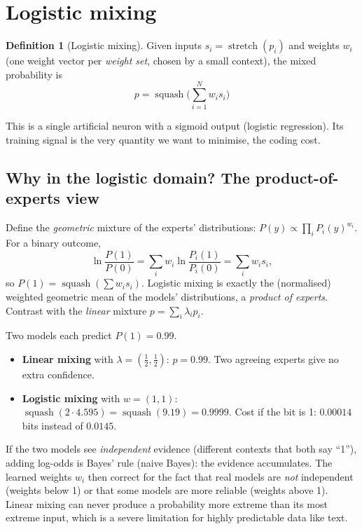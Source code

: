 \documentclass[11pt,a4paper,openany]{book}
\newcommand{\st}{\operatorname{stretch}}
\newcommand{\sq}{\operatorname{squash}}
\theoremstyle{definition}
\newtheorem{definition}{Definition}[chapter]
\theoremstyle{remark}
\begin{document}
\section{Logistic mixing}

\begin{definition}[Logistic mixing]
Given inputs $s_i=\st(p_i)$ and weights $w_i$ (one weight vector per \emph{weight set}, chosen by a small context), the mixed probability is
\[
\boxed{\;p=\sq\Big(\sum_{i=1}^Nw_is_i\Big)\;}
\]
\end{definition}
This is a single artificial neuron with a sigmoid output (logistic regression). Its training signal is the very quantity we want to minimise, the coding cost.

\subsection{Why in the logistic domain? The product-of-experts view}

Define the \emph{geometric} mixture of the experts' distributions: $P(y)\propto\prod_iP_i(y)^{w_i}$. For a binary outcome,
\[
\ln\frac{P(1)}{P(0)}=\sum_iw_i\ln\frac{P_i(1)}{P_i(0)}=\sum_iw_is_i,
\]
so $P(1)=\sq(\sum w_is_i)$. Logistic mixing is exactly the (normalised) weighted geometric mean of the models' distributions, a \emph{product of experts}. Contrast with the \emph{linear} mixture $p=\sum_i\lambda_ip_i$.

\begin{example}
Two models each predict $P(1)=0.99$.
\begin{itemize}
\item \textbf{Linear mixing} with $\lambda=(\frac12,\frac12)$: $p=0.99$. Two agreeing experts give no extra confidence.
\item \textbf{Logistic mixing} with $w=(1,1)$: $\sq(2\cdot4.595)=\sq(9.19)=0.9999$. Cost if the bit is 1: $0.00014$ bits instead of $0.0145$.
\end{itemize}
If the two models see \emph{independent} evidence (different contexts that both say ``1''), adding log-odds is Bayes' rule (naive Bayes): the evidence accumulates. The learned weights $w_i$ then correct for the fact that real models are \emph{not} independent (weights below 1) or that some models are more reliable (weights above 1). Linear mixing can never produce a probability more extreme than its most extreme input, which is a severe limitation for highly predictable data like text.
\end{example}
\end{document}

